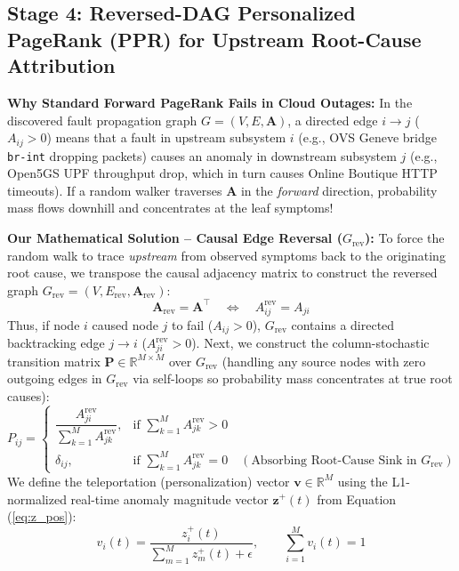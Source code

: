 \subsection{Stage 4: Reversed-DAG Personalized PageRank (PPR) for Upstream Root-Cause Attribution}
\textbf{Why Standard Forward PageRank Fails in Cloud Outages:} In the discovered fault propagation graph $G = (V, E, \mathbf{A})$, a directed edge $i \to j$ ($A_{ij} > 0$) means that a fault in upstream subsystem $i$ (e.g., OVS Geneve bridge \texttt{br-int} dropping packets) causes an anomaly in downstream subsystem $j$ (e.g., Open5GS UPF throughput drop, which in turn causes Online Boutique HTTP timeouts). If a random walker traverses $\mathbf{A}$ in the \textit{forward} direction, probability mass flows downhill and concentrates at the leaf symptoms!

\textbf{Our Mathematical Solution -- Causal Edge Reversal ($G_{\text{rev}}$):} To force the random walk to trace \textit{upstream} from observed symptoms back to the originating root cause, we transpose the causal adjacency matrix to construct the reversed graph $G_{\text{rev}} = (V, E_{\text{rev}}, \mathbf{A}_{\text{rev}})$:
\begin{equation}
\mathbf{A}_{\text{rev}} = \mathbf{A}^\top \quad \Longleftrightarrow \quad A_{ij}^{\text{rev}} = A_{ji}
\label{eq:adj_rev}
\end{equation}
Thus, if node $i$ caused node $j$ to fail ($A_{ij} > 0$), $G_{\text{rev}}$ contains a directed backtracking edge $j \to i$ ($A_{ji}^{\text{rev}} > 0$). Next, we construct the column-stochastic transition matrix $\mathbf{P} \in \mathbb{R}^{M \times M}$ over $G_{\text{rev}}$ (handling any source nodes with zero outgoing edges in $G_{\text{rev}}$ via self-loops so probability mass concentrates at true root causes):
\begin{equation}
P_{ij} = \begin{cases}
\dfrac{A_{ji}^{\text{rev}}}{\sum_{k=1}^{M} A_{jk}^{\text{rev}}}, & \text{if } \sum_{k=1}^{M} A_{jk}^{\text{rev}} > 0 \\[10pt]
\delta_{ij}, & \text{if } \sum_{k=1}^{M} A_{jk}^{\text{rev}} = 0 \quad (\text{Absorbing Root-Cause Sink in } G_{\text{rev}})
\end{cases}
\label{eq:ppr_trans}
\end{equation}
We define the teleportation (personalization) vector $\mathbf{v} \in \mathbb{R}^M$ using the L1-normalized real-time anomaly magnitude vector $\mathbf{z}^+(t)$ from Equation (\ref{eq:z_pos}):
\begin{equation}
v_i(t) = \frac{z_i^+(t)}{\sum_{m=1}^{M} z_m^+(t) + \epsilon}, \qquad \sum_{i=1}^{M} v_i(t) = 1
\label{eq:ppr_tele}
\end{equation}
